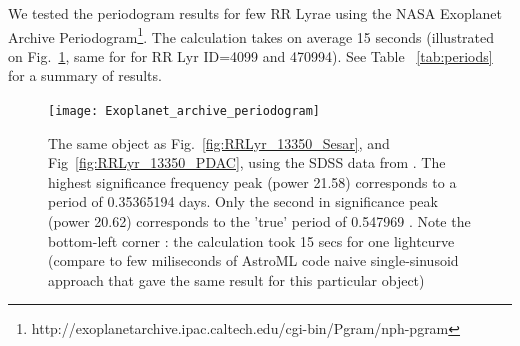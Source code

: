 \documentclass[fleqn,usenatbib]{mnras} %
\begin{document}


We tested the periodogram results for few RR Lyrae using the NASA Exoplanet Archive Periodogram\footnote{http://exoplanetarchive.ipac.caltech.edu/cgi-bin/Pgram/nph-pgram}. The calculation takes on average  15 seconds (illustrated on Fig.~\ref{fig:exoplanet_archive}, same for for RR Lyr ID=4099 and 470994). See Table ~\ref{tab:periods} for a summary of results. 

\begin{figure}
\texttt{[image: Exoplanet\_archive\_periodogram]}
\caption{ The same object as Fig.~\ref{fig:RRLyr_13350_Sesar}, and Fig~\ref{fig:RRLyr_13350_PDAC},  using  the SDSS data from \citep{sesar2010}.  The highest significance frequency peak (power 21.58) corresponds to  a period of 0.35365194 days. Only the second in significance peak (power 20.62) corresponds to the 'true' period of 0.547969 \citep{sesar2010}. Note the bottom-left corner : the calculation took 15 secs for one lightcurve (compare to few miliseconds of AstroML code naive single-sinusoid approach that gave the same result for this particular object) }
\label{fig:exoplanet_archive}
\end{figure}
\end{document}
